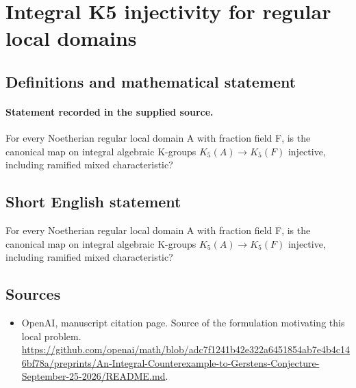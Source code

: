 \documentclass[11pt]{article}
\begin{document}
\section*{Integral K5 injectivity for regular local domains}\label{statement}
\subsection{Definitions and mathematical statement}
\paragraph{Statement recorded in the supplied source.}
For every Noetherian regular local domain A with fraction field F, is the canonical map on integral algebraic K-groups $K_{5}(A)\to K_{5}(F)$ injective, including ramified mixed characteristic?
\subsection{Short English statement}
For every Noetherian regular local domain A with fraction field F, is the canonical map on integral algebraic K-groups $K_{5}(A)\to K_{5}(F)$ injective, including ramified mixed characteristic?
\subsection{Sources}
\begin{itemize}
\item[S1] OpenAI, manuscript citation page. Source of the formulation motivating this local problem.
\url{https://github.com/openai/math/blob/adc7f1241b42e322a6451854ab7e4b4c146bf78a/preprints/An-Integral-Counterexample-to-Gerstens-Conjecture-September-25-2026/README.md}.
\end{itemize}
\end{document}
